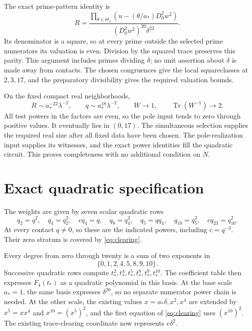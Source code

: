 \documentclass[11pt,a4paper]{article}
\DeclareMathOperator{\Tr}{Tr}\DeclareMathOperator{\Nm}{Nm}
\begin{document}
The exact prime-pattern identity is
\[
 R=\frac{\displaystyle\prod_{\theta\in\Theta_4}
          (u-(\theta/a_*)D_0^2w^2)}
        {(D_0^2w^2)^{20}\delta^{22}}.
\]
Its denominator is a square, so at every prime outside the selected
prime numerators its valuation is even. Division by the squared trace
preserves this parity. This argument includes primes dividing $\delta$;
no unit assertion about $\delta$ is made away from contacts.
The chosen congruences give the local squareclasses at $2,3,17$,
and the preparatory divisibility gives the required valuation bounds.

On the fixed compact real neighborhoods,
\[
 R\sim a_*^{-22}\lambda^{-2},\qquad
 q\sim a_*^{18}\lambda^{-2},\qquad
 W\longrightarrow1,\qquad\Tr(W^{-1})\longrightarrow2.
\]
All test powers in the factors are even, so the pole input tends to
zero through positive values. It eventually lies in $(0,17)$.
The simultaneous selection supplies the required real size after all
fixed data have been chosen. The pole-realization input supplies its
witnesses, and the exact power identities fill the quadratic circuit.
This proves completeness with no additional condition on $N$.

\section{Exact quadratic specification}
The weights are given by seven scalar quadratic rows
\[
 q_2=q^2,\quad q_4=q_2^2,\quad c q_4=q,\quad q_8=q_4^2,
 \quad q_5=qq_4,\quad q_{10}=q_5^2,\quad c q_{23}=q_{10}^2.
\]
At every contact $q\ne0$, so these are the indicated powers, including
$c=q^{-3}$. Their zero stratum is covered by \eqref{eq:clearing}.

Every degree from zero through twenty is a sum of two exponents in
\[
                        \{0,1,2,4,5,8,9,10\}.
\]
Successive quadratic rows compute $t_*^2,t_*^4,t_*^5,t_*^8,t_*^9,t_*^{10}$.
The coefficient table then expresses $F_4(t_*)$ as a quadratic polynomial
in this basis. At the base scale $a_*=1$, the same basis expresses
$\delta^{20}$, so no separate numerator power chain is needed.
At the other scale, the existing values $x=a_*\delta,x^2,x^4$
are extended by $x^5=xx^4$ and $x^{10}=(x^5)^2$, and the first equation
of \eqref{eq:clearing} uses $(x^{10})^2$.
The existing trace-clearing coordinate now represents $e\delta^2$.
\end{document}
